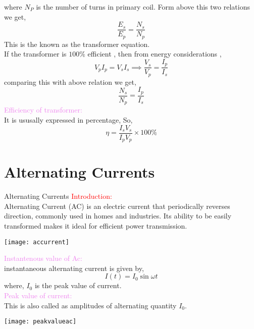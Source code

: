 \documentclass{beamer}
\begin{document}
\begin{frame}
where $N_P$ is the number of turns in primary coil. Form above this two relations we get,
\[
\frac{E_s}{E_p}=\frac{N_s}{N_p}
\]
This is the known as the transformer equation. \\
If the transformer is $100\%$ efficient , then from energy considerations , \\
\[
V_pI_p=V_s I_s \implies \frac{V_s}{V_p}=\frac{I_p}{I_s}
\]
comparing this with above relation we get,
\[
\frac{N_s}{N_p}=\frac{I_p}{I_s}
\]
\textcolor{violet}{Efficiency of transformer:}\\
It is ususally expressed in percentage, So, 
\[
\eta=\frac{I_sV_s}{I_pV_p}\times 100\%
\]

\end{frame}



\section{Alternating Currents}
\begin{frame}{Alternating Currents}
\textcolor{red}{Introduction:}\\
Alternating Current (AC) is an electric current that periodically reverses direction, commonly used in homes and industries. Its ability to be easily transformed makes it ideal for efficient power transmission.
\begin{center}
\texttt{[image: accurrent]}
\end{center}
\end{frame}

\begin{frame}
\textcolor{violet}{Instantenous value of Ac:}\\
instantaneous alternating current is given by,
\[
I(t)=I_0\sin\omega t
\]
where, $I_0$ is the peak value of current.\\
\textcolor{violet}{Peak value of current:}\\
 This is also called as amplitudes of alternating quantity $I_0$.
\begin{center}
\texttt{[image: peakvalueac]}
\end{center}

\end{frame}
\end{document}
